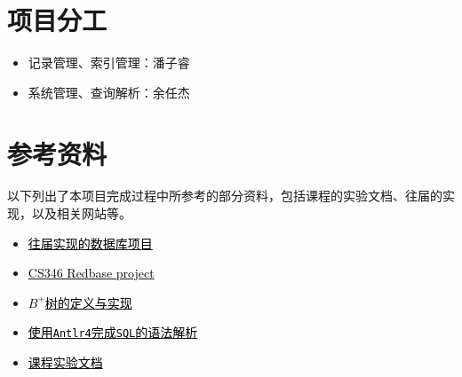 \documentclass[11pt]{article}
\begin{document}
\section{项目分工}
\begin{itemize}
    \item 记录管理、索引管理：潘子睿
    \item 系统管理、查询解析：余任杰
\end{itemize}

\section{参考资料}
以下列出了本项目完成过程中所参考的部分资料，包括课程的实验文档、往届的实现，以及相关网站等。
\begin{itemize}
    \item \href{https://github.com/miskcoo/TrivialDB}{\textcolor{black}{往届实现的数据库项目}}
    \item \href{https://web.stanford.edu/class/cs346/2015/redbase.html}{\textcolor{black}{CS346 Redbase project}}
    \item \href{https://en.wikipedia.org/wiki/B%2B_tree}{\textcolor{black}{$B^+$树的定义与实现}}
    \item \href{https://www.antlr.org/download.html}{\textcolor{black}{使用\texttt{Antlr4}完成\texttt{SQL}的语法解析}}
    \item \href{https://thu-db.github.io/dbs-tutorial/}{\textcolor{black}{课程实验文档}}
\end{itemize}
\end{document}
